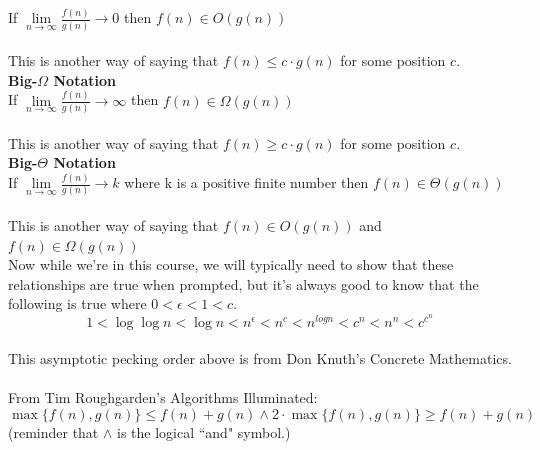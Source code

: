 \documentclass[12pt]{article}
\begin{document}
If $\lim\limits_{n\to\infty}{\frac{f(n)}{g(n)}}\to0$ then $f(n) \in O(g(n))$\\\\
This is another way of saying that $f(n) \leq c \cdot g(n)$ for some position $c$.\\
\textbf{Big-$\Omega$ Notation}\\
If $\lim\limits_{n\to\infty}{\frac{f(n)}{g(n)}}\to\infty$ then $f(n) \in \Omega(g(n))$\\\\
This is another way of saying that $f(n) \geq c \cdot g(n)$ for some position $c$.\\
\textbf{Big-$\Theta$ Notation}\\
If $\lim\limits_{n\to\infty}{\frac{f(n)}{g(n)}}\to k$ where k is a positive finite number then $f(n) \in \Theta(g(n))$\\\\
This is another way of saying that $f(n) \in O(g(n))$ and $f(n) \in \Omega(g(n))$\.\\
Now while we're in this course, we will typically need to show that these relationships are true when prompted, but it's always good to know that the following is true where \begin{math}0 < \epsilon < 1 < c\end{math}.\\
\[1 < \log{\log{n}} < \log{n} < n^{\epsilon} < n^c < n^{log{n}} < c^n < n^n < c^{c^{n}}\]\\
This asymptotic pecking order above is from Don Knuth's Concrete Mathematics.\\\\
\newpage
From Tim Roughgarden's Algorithms Illuminated: \\
$$\max\{f(n),g(n)\} \leq f(n) + g(n) \land  2 \cdot \max\{f(n),g(n)\} \geq f(n) + g(n)$$
(reminder that $\land$ is the logical ``and" symbol.)\\\\
\end{document}
